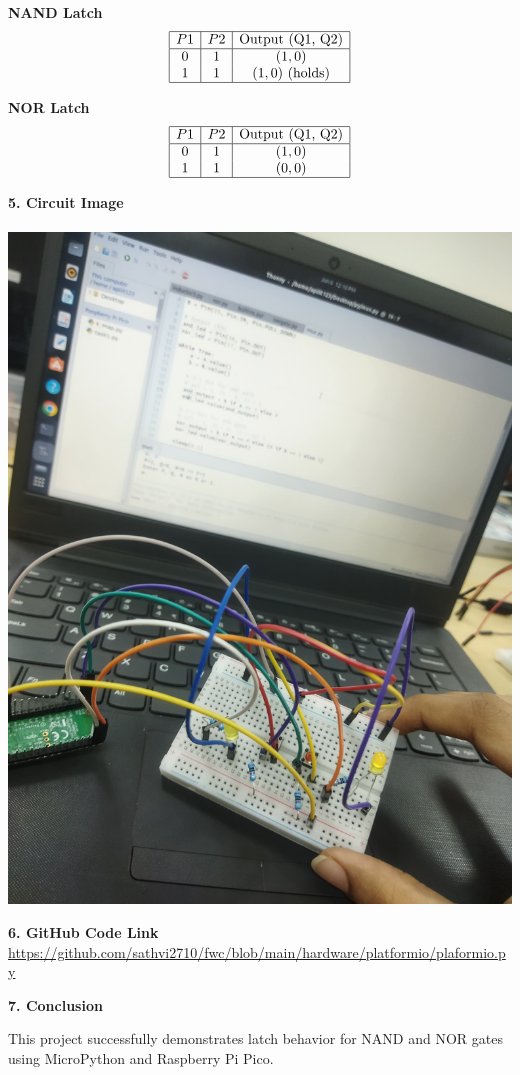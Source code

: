 \documentclass[12pt]{article}
\begin{document}
\vspace{2em}
\begin{minipage}{0.45\linewidth}
\centering
\textbf{NAND Latch} \\
\[
\begin{array}{|c|c|c|}
\hline
P1 & P2 & \text{Output (Q1, Q2)} \\
\hline
0 & 1 & (1, 0) \\
1 & 1 & (1, 0) \text{ (holds)} \\
\hline
\end{array}
\]
\end{minipage}
\hfill
\begin{minipage}{0.45\linewidth}
\centering
\textbf{NOR Latch} \\
\[
\begin{array}{|c|c|c|}
\hline
P1 & P2 & \text{Output (Q1, Q2)} \\
\hline
0 & 1 & (1, 0) \\
1 & 1 & (0, 0) \\
\hline
\end{array}
\]
\end{minipage}

\vspace{20em}
\newpage
\noindent\textbf{5. Circuit Image} \\
\\
\includegraphics[width=0.6\linewidth]{assembly.jpeg}


\vspace{1em}
\noindent\textbf{6. GitHub Code Link} \\
\url{https://github.com/sathvi2710/fwc/blob/main/hardware/platformio/plaformio.py}

\vspace{1em}
\noindent\textbf{7. Conclusion}

This project successfully demonstrates latch behavior for NAND and NOR gates using MicroPython and Raspberry Pi Pico. 
\end{document}
